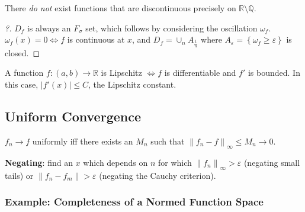 \begin{proposition}

There \emph{do not} exist functions that are discontinuous precisely on
\({\mathbb{R}}\setminus {\mathbb{Q}}\).

\end{proposition}

\begin{proof}[?]

\(D_f\) is always an \(F_\sigma\) set, which follows by considering the
oscillation \(\omega_f\). \(\omega_f(x) = 0 \iff f\) is continuous at
\(x\), and \(D_f = \cup_n A_{\frac 1 n}\) where
\(A_\varepsilon = \left\{{\omega_f \geq \varepsilon}\right\}\) is
closed.

\end{proof}

\begin{proposition}

A function \(f: (a, b) \to {\mathbb{R}}\) is Lipschitz \(\iff f\) is
differentiable and \(f'\) is bounded. In this case,
\({\left\lvert {f'(x)} \right\rvert} \leq C\), the Lipschitz constant.

\end{proposition}

\hypertarget{uniform-convergence}{%
\subsection{Uniform Convergence}\label{uniform-convergence}}

\begin{proposition}

\(f_n \to f\) uniformly iff there exists an \(M_n\) such that
\({\left\lVert {f_n - f} \right\rVert}_\infty \leq M_n \to 0\).

\end{proposition}

\begin{remark}

\textbf{Negating}: find an \(x\) which depends on \(n\) for which
\({\left\lVert {f_n} \right\rVert}_\infty > \varepsilon\) (negating
small tails) or \({\left\lVert {f_n - f_m} \right\rVert} > \varepsilon\)
(negating the Cauchy criterion).

\end{remark}

\hypertarget{example-completeness-of-a-normed-function-space}{%
\subsubsection{Example: Completeness of a Normed Function
Space}\label{example-completeness-of-a-normed-function-space}}

